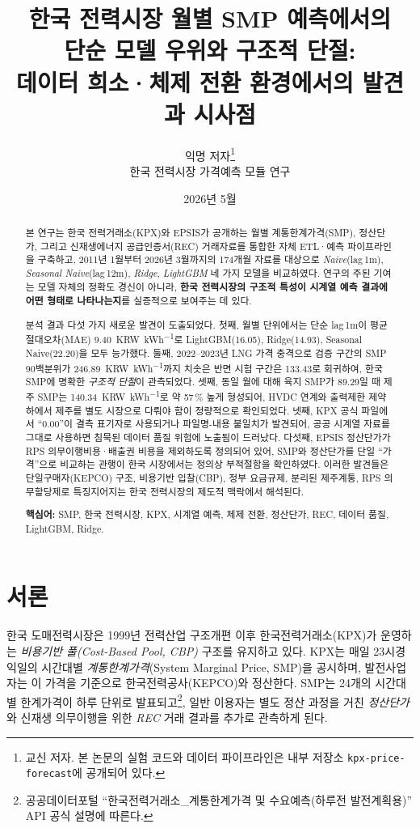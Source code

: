 \documentclass[11pt,a4paper]{article}
\title{
  한국 전력시장 월별 SMP 예측에서의 \\
  단순 모델 우위와 구조적 단절: \\
  데이터 희소·체제 전환 환경에서의 발견과 시사점
}
\author{
  익명 저자\thanks{교신 저자. 본 논문의 실험 코드와 데이터 파이프라인은
  내부 저장소 \texttt{kpx-price-forecast}에 공개되어 있다.}\\
  \small 한국 전력시장 가격예측 모듈 연구
}
\date{2026년 5월}
\begin{document}
\maketitle

\begin{abstract}
본 연구는 한국 전력거래소(KPX)와 EPSIS가 공개하는 월별
계통한계가격(SMP), 정산단가, 그리고 신재생에너지 공급인증서(REC)
거래자료를 통합한 자체 ETL·예측 파이프라인을 구축하고,
2011년 1월부터 2026년 3월까지의 174개월 자료를 대상으로
\textit{Naive}(lag\,1m), \textit{Seasonal Naive}(lag\,12m),
\textit{Ridge}, \textit{LightGBM} 네 가지 모델을 비교하였다.
연구의 주된 기여는 모델 자체의 정확도 경신이 아니라,
\textbf{한국 전력시장의 구조적 특성이 시계열 예측 결과에 어떤
형태로 나타나는지}를 실증적으로 보여주는 데 있다.

분석 결과 다섯 가지 새로운 발견이 도출되었다.
첫째, 월별 단위에서는 단순 lag\,1m이 평균절대오차(MAE)
\SI{9.40}{KRW\per kWh}로 LightGBM(\SI{16.05}{}),
Ridge(\SI{14.93}{}), Seasonal Naive(\SI{22.20}{})을 모두 능가했다.
둘째, 2022--2023년 LNG 가격 충격으로 검증 구간의 SMP 90백분위가
\SI{246.89}{KRW\per kWh}까지 치솟은 반면 시험 구간은
\SI{133.43}{}로 회귀하여, 한국 SMP에 명확한
\textit{구조적 단절}이 관측되었다.
셋째, 동일 월에 대해 육지 SMP가 \SI{89.29}{}일 때 제주 SMP는
\SI{140.34}{KRW\per kWh}로 약 57\,\% 높게 형성되어,
HVDC 연계와 출력제한 제약 하에서 제주를 별도 시장으로 다뤄야 함이
정량적으로 확인되었다.
넷째, KPX 공식 파일에서 ``0.00''이 결측 표기자로 사용되거나
파일명-내용 불일치가 발견되어, 공공 시계열 자료를 그대로
사용하면 침묵된 데이터 품질 위험에 노출됨이 드러났다.
다섯째, EPSIS 정산단가가 RPS 의무이행비용·배출권 비용을
제외하도록 정의되어 있어, SMP와 정산단가를 단일 ``가격''으로 비교하는
관행이 한국 시장에서는 정의상 부적절함을 확인하였다.
이러한 발견들은 단일구매자(KEPCO) 구조,
비용기반 입찰(CBP), 정부 요금규제, 분리된 제주계통, RPS 의무할당제로
특징지어지는 한국 전력시장의 제도적 맥락에서 해석된다.

\noindent\textbf{핵심어:} SMP, 한국 전력시장, KPX, 시계열 예측,
체제 전환, 정산단가, REC, 데이터 품질, LightGBM, Ridge.
\end{abstract}

\section{서론}
\label{sec:intro}

한국 도매전력시장은 1999년 전력산업 구조개편 이후 한국전력거래소(KPX)가
운영하는 \textit{비용기반 풀(Cost-Based Pool, CBP)} 구조를 유지하고 있다.
KPX는 매일 23시경 익일의 시간대별 \textit{계통한계가격}(System Marginal
Price, SMP)을 공시하며, 발전사업자는 이 가격을 기준으로
한국전력공사(KEPCO)와 정산한다. SMP는 24개의 시간대별 한계가격이
하루 단위로 발표되고\footnote{공공데이터포털 ``한국전력거래소\_계통한계가격 및
수요예측(하루전 발전계획용)'' API 공식 설명에 따른다.},
일반 이용자는 별도 정산 과정을 거친 \textit{정산단가}와
신재생 의무이행을 위한 \textit{REC} 거래 결과를 추가로 관측하게 된다.
\end{document}
